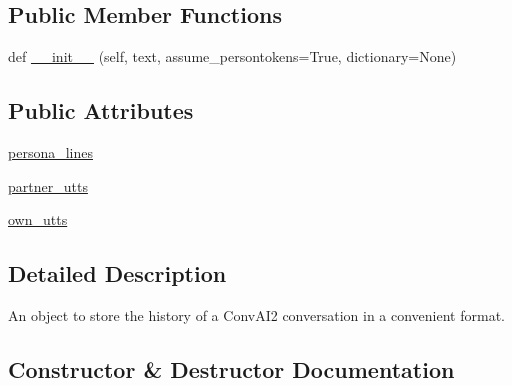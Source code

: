 \subsection*{Public Member Functions}
\begin{DoxyCompactItemize}
\item 
def \hyperlink{classprojects_1_1controllable__dialogue_1_1controllable__seq2seq_1_1util_1_1ConvAI2History_ab28df6476a9460112e5a00eafba01c4c}{\+\_\+\+\_\+init\+\_\+\+\_\+} (self, text, assume\+\_\+persontokens=True, dictionary=None)
\end{DoxyCompactItemize}
\subsection*{Public Attributes}
\begin{DoxyCompactItemize}
\item 
\hyperlink{classprojects_1_1controllable__dialogue_1_1controllable__seq2seq_1_1util_1_1ConvAI2History_a45addcda1344d422a0a8d29598944884}{persona\+\_\+lines}
\item 
\hyperlink{classprojects_1_1controllable__dialogue_1_1controllable__seq2seq_1_1util_1_1ConvAI2History_af543c29eeb1a89f33388640305f16c84}{partner\+\_\+utts}
\item 
\hyperlink{classprojects_1_1controllable__dialogue_1_1controllable__seq2seq_1_1util_1_1ConvAI2History_a12340ae0e928a10c22ea9abfebf02b30}{own\+\_\+utts}
\end{DoxyCompactItemize}


\subsection{Detailed Description}
\begin{DoxyVerb}An object to store the history of a ConvAI2 conversation in a convenient format.
\end{DoxyVerb}
 

\subsection{Constructor \& Destructor Documentation}
\mbox{\label{classprojects_1_1controllable__dialogue_1_1controllable__seq2seq_1_1util_1_1ConvAI2History_ab28df6476a9460112e5a00eafba01c4c}} 
